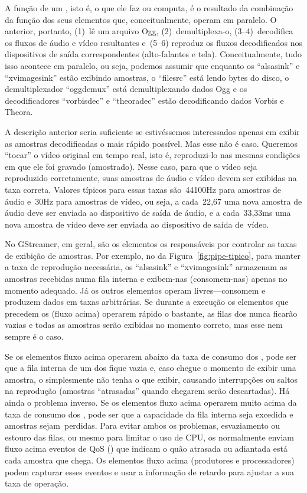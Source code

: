 \documentclass{SBCbookchapter}
\begin{document}
A função de um , isto é, o que ele faz ou computa, é o
resultado da combinação da função dos seus elementos que, conceitualmente,
operam em paralelo.  O  anterior, portanto, (1)~lê um arquivo
Ogg, (2)~demultiplexa-o, (3--4)~decodifica os fluxos de áudio e vídeo
resultantes e~(5--6) reproduz os fluxos decodificados nos dispositivos de
saída correspondentes (alto-falantes e tela).  Conceitualmente, tudo isso
acontece em paralelo, ou seja, podemos assumir que enquanto os 
``alsasink'' e ``xvimagesink'' estão exibindo amostras, o 
``filesrc'' está lendo bytes do disco, o demultiplexador ``oggdemux'' está
demultiplexando dados Ogg e os decodificadores ``vorbisdec'' e ``theoradec''
estão decodificando dados Vorbis e Theora.

A descrição anterior seria suficiente se estivéssemos interessados apenas em
exibir as amostras decodificadas o mais rápido possível.  Mas esse não é
caso.  Queremos ``tocar'' o vídeo original em tempo real, isto é,
reproduzi-lo nas mesmas condições em que ele foi gravado (amostrado).  Nesse
caso, para que o vídeo seja reproduzido corretamente, suas amostras de áudio
e vídeo devem ser exibidas na taxa correta.  Valores típicos para essas
taxas são~44100Hz para amostras de áudio e~30Hz para amostras de vídeo, ou
seja, a cada~22{,}67 uma nova amostra de áudio deve ser enviada ao
dispositivo de saída de áudio, e a cada~33{,}33ms uma nova amostra de vídeo
deve ser enviada ao dispositivo de saída de~vídeo.

No GStreamer, em geral, são os elementos  os responsáveis por
controlar as taxas de exibição de amostras.  Por exemplo, no 
da Figura~\ref{fig:pipe-tipico}, para manter a taxa de reprodução
necessária, os  ``alsasink'' e ``xvimagesink'' armazenam as
amostras recebidas numa fila interna e exibem-nas (consomem-nas) apenas no
momento adequado.  Já os outros elementos operam livres---consomem e
produzem dados em taxas arbitrárias.  Se durante a execução os elementos que
precedem os  (fluxo acima) operarem rápido o bastante, as filas
dos  nunca ficarão vazias e todas as amostras serão exibidas no
momento correto, mas esse nem sempre é o caso.

Se os elementos fluxo acima operarem abaixo da taxa de consumo dos
, pode ser que a fila interna de um dos  fique vazia e,
caso chegue o momento de exibir uma amostra, o  simplesmente não
tenha o que exibir, causando interrupções ou saltos na reprodução (amostras
``atrasadas'' quando chegarem serão descartadas).  Há ainda o problema
inverso.  Se os elementos fluxo acima operarem muito acima da taxa de
consumo dos , pode ser que a capacidade da fila interna seja
excedida e amostras sejam~perdidas.  Para evitar ambos os problemas,
esvaziamento ou estouro das filas, ou mesmo para limitar o uso de CPU, os
 normalmente enviam fluxo acima eventos de QoS () que indicam o quão atrasada ou adiantada está cada amostra que
chega.  Os elementos fluxo acima (produtores e processadores) podem capturar
esses eventos e usar a informação de retardo para ajustar a sua taxa de
operação.
\end{document}
